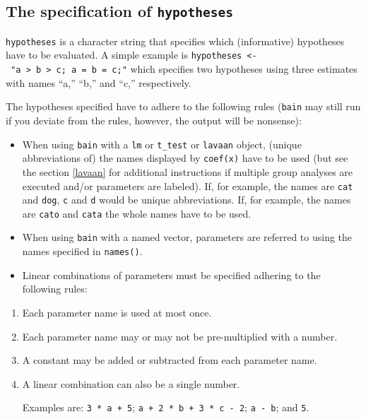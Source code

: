 \documentclass[
]{book}
\providecommand{\tightlist}{%
  \setlength{\itemsep}{0pt}\setlength{\parskip}{0pt}}
\begin{document}
\hypertarget{the-specification-of-hypotheses}{%
\subsection{\texorpdfstring{The specification of \texttt{hypotheses}}{The specification of hypotheses}}\label{the-specification-of-hypotheses}}

\texttt{hypotheses} is a character string that specifies which (informative)
hypotheses have to be evaluated. A simple example is \texttt{hypotheses\ \textless{}-\ "a\ \textgreater{}\ b\ \textgreater{}\ c;\ a\ =\ b\ =\ c;"} which specifies two hypotheses using three estimates with
names ``a,'' ``b,'' and ``c,'' respectively.

The hypotheses specified have to adhere to the following rules (\texttt{bain} may still run if you
deviate from the rules, however, the output will be nonsense):

\begin{itemize}
\tightlist
\item
  When using \texttt{bain} with a \texttt{lm} or \texttt{t\_test} or \texttt{lavaan} object,
  (unique abbreviations of) the names
  displayed by \texttt{coef(x)} have to be used (but see the section \ref{lavaan} for additional instructions if multiple group
  analyses are executed and/or parameters are labeled). If,
  for example, the names are \texttt{cat} and \texttt{dog}, \texttt{c}
  and \texttt{d} would be unique abbreviations. If, for example, the names are \texttt{cato}
  and \texttt{cata} the whole
  names have to be used.
\item
  When using \texttt{bain} with a named vector, parameters are referred to using
  the names specified in \texttt{names()}.
\item
  Linear combinations of parameters must be specified adhering to the
  following rules:
\end{itemize}

\begin{enumerate}
\def\labelenumi{\alph{enumi})}
\item
  Each parameter name is used at most once.
\item
  Each parameter name may or may not be pre-multiplied with a number.
\item
  A constant may be added or subtracted from each parameter name.
\item
  A linear combination can also be a single number.

  Examples are: \texttt{3\ *\ a\ +\ 5}; \texttt{a\ +\ 2\ *\ b\ +\ 3\ *\ c\ -\ 2}; \texttt{a\ -\ b}; and \texttt{5}.
\end{enumerate}
\end{document}
